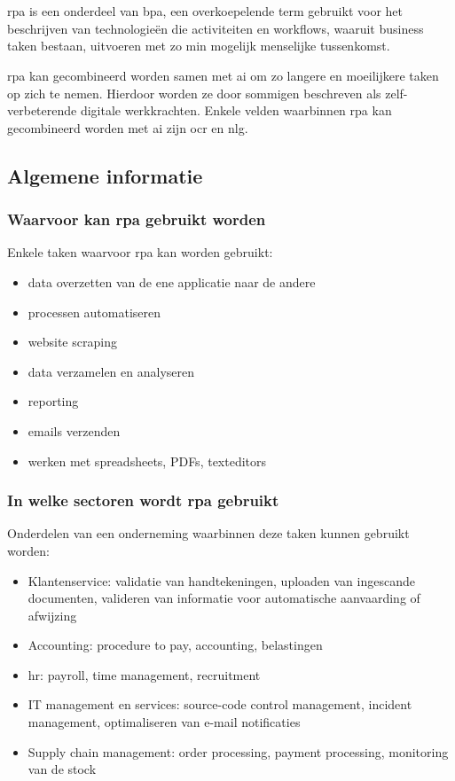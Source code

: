 \chapter{}
\label{ch:stand-van-zaken}

\acrshort{rpa} is een onderdeel van \acrfull{bpa}, een overkoepelende term gebruikt voor het beschrijven van technologieën die activiteiten en workflows, waaruit business taken bestaan, uitvoeren met zo min mogelijk menselijke tussenkomst. \autocite{everythingRPA}

\acrshort{rpa} kan gecombineerd worden samen met \acrfull{ai} om zo langere en moeilijkere taken op zich te nemen. Hierdoor worden ze door sommigen beschreven als zelf-verbeterende digitale werkkrachten. Enkele velden waarbinnen \acrshort{rpa} kan gecombineerd worden met \acrshort{ai} zijn \acrfull{ocr} en \acrfull{nlg}. \autocite{everythingRPA}

\section{Algemene informatie}

\subsection{Waarvoor kan \acrshort{rpa} gebruikt worden}
Enkele taken waarvoor \acrshort{rpa} kan worden gebruikt:
\begin{itemize}
	\item data overzetten van de ene applicatie naar de andere
	\item processen automatiseren
	\item website scraping
	\item data verzamelen en analyseren
	\item reporting
	\item emails verzenden
	\item werken met spreadsheets, PDFs, texteditors
\end{itemize}
\autocite{everythingRPA} \autocite{idrRPA}

\subsection{In welke sectoren wordt \acrshort{rpa} gebruikt}
Onderdelen van een onderneming waarbinnen deze taken kunnen gebruikt worden:
\begin{itemize}
	\item Klantenservice: validatie van handtekeningen, uploaden van ingescande documenten, valideren van informatie voor automatische aanvaarding of afwijzing
	\item Accounting: procedure to pay, accounting, belastingen
	\item \acrfull{hr}: payroll, time management, recruitment
	\item IT management en services: source-code control management, incident management, optimaliseren van e-mail notificaties
	\item Supply chain management: order processing, payment processing, monitoring van de stock
\end{itemize}
\autocite{everythingRPA}

